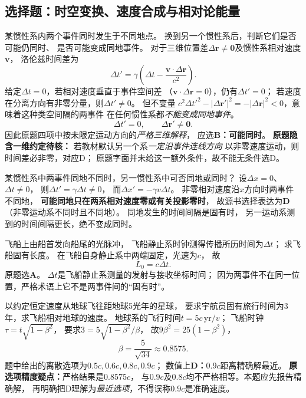 \subsection{选择题：时空变换、速度合成与相对论能量}

\problemtext 某惯性系内两个事件同时发生于不同地点。
换到另一个惯性系后，判断它们是否可能仍同时、
是否可能变成同地事件。
\workings
对于三维位置差$\Delta\bm r\ne\bm0$及惯性系相对速度$\bm v$，
洛伦兹时间差为
\[
\Delta t'=\gamma\left(\Delta t-\frac{\bm v\cdot\Delta\bm r}{c^2}\right).
\]
给定$\Delta t=0$，若相对速度垂直于事件空间差
（$\bm v\cdot\Delta\bm r=0$），仍有$\Delta t'=0$；
若速度在分离方向有非零分量，则$\Delta t'\ne0$。
但不变量
$c^2\Delta t'^2-|\Delta\bm r'|^2
=-|\Delta\bm r|^2<0$，意味着这种类空间隔的两事件
在任何惯性系都\emph{不能变成同地事件}。
\[
\boxed{\Delta t'=0},\qquad\boxed{\Delta\bm r'\ne\bm0}.
\]
因此原题四项中按未限定运动方向的\emph{严格三维解释}，
应选\textbf{B：可能同时}。
\crosscheck \textbf{原题隐含一维约定待核：}
若教材默认另一个系\emph{一定沿事件连线方向}
以非零速度运动，则时间差必非零，对应D；
原题字面并未给这一额外条件，故不能无条件选D。

\problemtext 某惯性系中两事件同地不同时，另一惯性系中可否同地或同时？
\workings
设$\Delta x=0$、$\Delta t\ne0$，
则$\Delta t'=\gamma\Delta t\ne0$，
而$\Delta x'=-\gamma v\Delta t$。
非零相对速度沿$x$方向时两事件不同地，
\textbf{可能同地只在两系相对速度零或有关投影零时}，
故源书选择表达为\textbf{D}（非零运动系不同时且不同地）。
\crosscheck 同地发生的时间间隔是固有时，
另一运动系测到的时间间隔更长，绝不变成同时。

\problemtext 飞船上由船首发向船尾的光脉冲，
飞船静止系时钟测得传播所历时间为$\Delta t$；
求飞船固有长度。
\workings
在飞船自身静止系中两端固定，光速为$c$，
故
\[
\boxed{L_0=c\Delta t}.
\]
原题选\textbf{A}。
\crosscheck $\Delta t$是飞船静止系测量的发射与接收坐标时间；
因为两事件不在同一位置，严格术语上它不是两事件间的“固有时”。

\problemtext 以约定恒定速度从地球飞往距地球5光年的星球，
要求宇航员固有旅行时间为3年，求飞船相对地球的速度。
\workings
地球系的飞行时间$t=5c\,\mathrm{yr}/v$；
飞船时钟$\tau=t\sqrt{1-\beta^2}$，
要求$3=5\sqrt{1-\beta^2}/\beta$，
故$9\beta^2=25(1-\beta^2)$，
\[
\boxed{\beta=\frac5{\sqrt{34}}\approx0.8575}.
\]
题中给出的离散选项为$0.5c,0.6c,0.8c,0.9c$；
数值上\textbf{D：$0.9c$}距离精确解最近。
\crosscheck \textbf{原选项精度疑点：}严格结果是$0.8575c$，
与$0.9c$及$0.8c$均不严格相等。本题应先报告精确解，
再明确把D理解为\emph{最近选项}，不得误称$0.9c$是准确速度。

